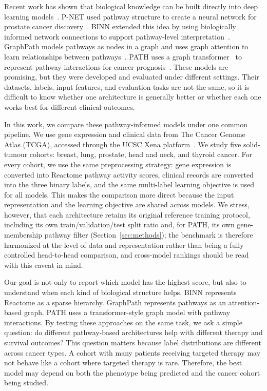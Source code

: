 \documentclass[sigconf]{acmart}
\begin{document}
Recent work has shown that biological knowledge can be built directly into
deep learning models~\cite{wysocka2023review,zohari2025gnnsurvey,zhang2025deeplearningreview}. P-NET used pathway structure to create a neural
network for prostate cancer discovery~\cite{elmarakeby2021pnet}. BINN
extended this idea by using biologically informed network connections to
support pathway-level interpretation~\cite{hartman2023binn,pathhdnn2025}. GraphPath
models pathways as nodes in a graph and uses graph attention to learn
relationships between pathways~\cite{ma2024graphpath,velickovic2018gat,yan2024prior,dou2025mogcan,mcgnn2025,jiang2024irnet,pathnetdrp2024}.
PATH uses a graph transformer~\cite{dwivedi2021graphtransformer,liu2024pathformer,zhang2022tgem} to represent pathway interactions for cancer
prognosis~\cite{howlader2026path}. These models are promising, but they
were developed and evaluated under different settings. Their datasets,
labels, input features, and evaluation tasks are not the same, so it is
difficult to know whether one architecture is generally better or whether
each one works best for different clinical outcomes.

In this work, we compare these pathway-informed models under one common
pipeline. We use gene expression and clinical data from The Cancer Genome
Atlas (TCGA), accessed through the UCSC Xena platform~\cite{Weinstein2013,
xena2020}. We study five solid-tumour cohorts: breast, lung, prostate, head
and neck, and thyroid cancer. For every cohort, we use the same preprocessing
strategy: gene expression is converted into Reactome pathway activity scores,
clinical records are converted into the three binary labels, and the same
multi-label learning objective is used for all models. This makes the
comparison more direct because the input representation and the learning
objective are shared across models. We stress, however, that each
architecture retains its original reference training protocol, including its
own train/validation/test split ratio and, for PATH, its own gene-membership
pathway filter (Section~\ref{sec:methods}); the benchmark is therefore
harmonized at the level of data and representation rather than being a fully
controlled head-to-head comparison, and cross-model rankings should be read
with this caveat in mind.

Our goal is not only to report which model has the highest score, but also
to understand when each kind of biological structure helps. BINN represents
Reactome as a sparse hierarchy. GraphPath represents pathways as an
attention-based graph. PATH uses a transformer-style graph model with
pathway interactions. By testing these approaches on the same task, we ask a
simple question: do different pathway-based architectures help with
different therapy and survival outcomes? This question matters because label
distributions are different across cancer types. A cohort with many patients
receiving targeted therapy may not behave like a cohort where targeted
therapy is rare. Therefore, the best model may depend on both the phenotype
being predicted and the cancer cohort being studied.
\end{document}
